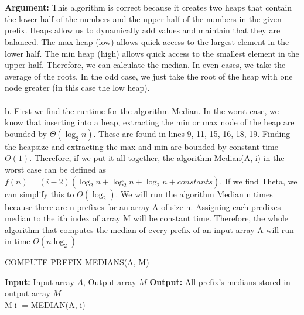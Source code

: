\documentclass[11pt, a4paper]{article}
\begin{document}
\\\\
\textbf{Argument: } This algorithm is correct because it creates two heaps that contain the lower half of the numbers and the upper half of the numbers in the given prefix. Heaps allow us to dynamically add values and maintain that they are balanced. The max heap (low) allows quick access to the largest element in the lower half. The min heap (high) allows quick access to the smallest element in the upper half. Therefore, we can calculate the median. In even cases, we take the average of the roots. In the odd case, we just take the root of the heap with one node greater (in this case the low heap). 
\\\\
b. First we find the runtime for the algorithm Median. In the worst case, we know that inserting into a heap, extracting the min or max node of the heap are bounded by $\Theta(\log_2{n})$. These are found in lines 9, 11, 15, 16, 18, 19. Finding the heapsize and extracting the max and min are bounded by constant time $\Theta(1)$. Therefore, if we put it all together, the algorithm Median(A, i) in the worst case can be defined as $f(n) = (i-2)(\log_2{n} + \log_2{n} + \log_2{n} + constants)$. If we find Theta, we can simplify this to $\Theta(\log_2)$. We will run the algorithm Median n times because there are n prefixes for an array A of size n. Assigning each predixes median to the ith index of array M will be constant time. Therefore, the whole algorithm that computes the median of every prefix of an input array A will run in time $\Theta(n\log_2)$


\begin{algorithm} [H]
\caption{COMPUTE-PREFIX-MEDIANS(A, M)}
\begin{algorithmic}[1]
\State \textbf{Input:} Input array \( A \), Output array \( M \)
\State \textbf{Output:} All prefix's medians stored in output array \( M \)
\\
     \State M[i] = MEDIAN(A, i)
\EndFor


\end{algorithmic}
\end{algorithm}
\end{document}
